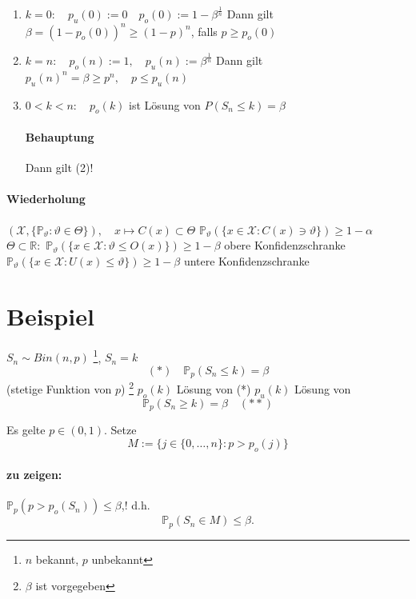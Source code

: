 \documentclass[a4paper,11pt,notitlepage]{report}
\newcommand{\R}{{\ensuremath{\mathbb{R}}}}
\newcommand{\Prim}{{\ensuremath{\mathbb{P}}}}
\begin{document}
	\begin{enumerate}
		\item $k=0: \quad p_u(0) := 0 \quad p_o(0) := 1-\beta^{\frac{1}{n}}$
		\newline
		Dann gilt $\beta = \left(1 - p_o(0) \right)^n \geq (1-p)^n$, falls $p \geq p_o(0)$
		
		\item $k=n: \quad p_o(n):= 1, \quad p_u(n) := \beta^{\frac{1}{n}}$
		\newline
		Dann gilt $p_u(n)^n = \beta \geq p^n, \quad p \leq p_u(n)$
		
		\item $0 < k < n: \quad p_o(k)$ ist Lösung von $P(S_n \leq k) = \beta$
		\paragraph{Behauptung} Dann gilt (2)!
	\end{enumerate}

\paragraph{Wiederholung}
$(\mathcal{X}, \{\Prim_\vartheta \colon \vartheta \in \Theta \}), \quad x \mapsto C(x) \subset \Theta$
\newline
$\Prim_\vartheta(\{x \in \mathcal{X} \colon C(x) \ni \vartheta\}) \geq 1 - \alpha$
\newline
$\Theta \subset \R:$
\newline
$\Prim_\vartheta(\{x \in \mathcal{X} \colon \vartheta \leq O(x)\}) \geq 1 - \beta$ obere Konfidenzschranke
\newline
$\Prim_\vartheta(\{x \in \mathcal{X} \colon U(x) \leq \vartheta\}) \geq 1 - \beta$ untere Konfidenzschranke

\section*{Beispiel}
$S_n \sim Bin(n,p)$ \footnote{$n$ bekannt, $p$ unbekannt}, $S_n = k$
$$(*) \quad \Prim_p(S_n \leq k) = \beta$$ (stetige Funktion von $p$) \footnote{$\beta$ ist vorgegeben}
\newline
$p_o(k)$ Lösung von (*)
\newline
$p_u(k)$ Lösung von
$$\Prim_p(S_n \geq k) = \beta \quad (**)$$

Es gelte $p \in (0,1)$. Setze
$$M:= \{j \in \{0, \ldots, n\} \colon p > p_o(j)\}$$

\paragraph{zu zeigen:}
$\Prim_p(p > p_o(S_n)) \leq \beta$,! d.h.
$$\Prim_p(S_n \in M) \leq \beta.$$
\end{document}
